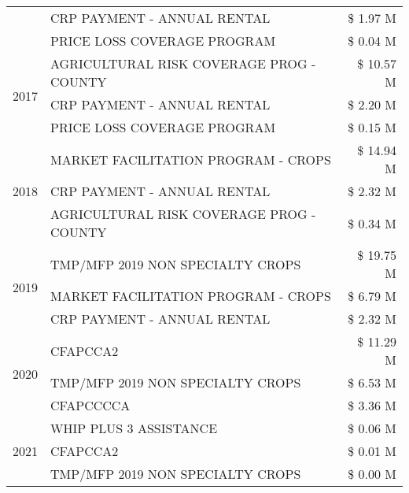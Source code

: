 \begin{tabular}{llr}
 & CRP PAYMENT - ANNUAL RENTAL                   & \$ 1.97 M \\
 & PRICE LOSS COVERAGE PROGRAM                   & \$ 0.04 M \\
\cline{1-3}
\multirow[t]{3}{*}{2017} & AGRICULTURAL RISK COVERAGE PROG - COUNTY & \$ 10.57 M \\
 & CRP PAYMENT - ANNUAL RENTAL & \$ 2.20 M \\
 & PRICE LOSS COVERAGE PROGRAM & \$ 0.15 M \\
\cline{1-3}
\multirow[t]{3}{*}{2018} & MARKET FACILITATION PROGRAM - CROPS & \$ 14.94 M \\
 & CRP PAYMENT - ANNUAL RENTAL & \$ 2.32 M \\
 & AGRICULTURAL RISK COVERAGE PROG - COUNTY & \$ 0.34 M \\
\cline{1-3}
\multirow[t]{3}{*}{2019} & TMP/MFP 2019 NON SPECIALTY CROPS & \$ 19.75 M \\
 & MARKET FACILITATION PROGRAM - CROPS & \$ 6.79 M \\
 & CRP PAYMENT - ANNUAL RENTAL & \$ 2.32 M \\
\cline{1-3}
\multirow[t]{3}{*}{2020} & CFAPCCA2 & \$ 11.29 M \\
 & TMP/MFP 2019 NON SPECIALTY CROPS & \$ 6.53 M \\
 & CFAPCCCCA & \$ 3.36 M \\
\cline{1-3}
\multirow[t]{3}{*}{2021} & WHIP PLUS 3 ASSISTANCE & \$ 0.06 M \\
 & CFAPCCA2 & \$ 0.01 M \\
 & TMP/MFP 2019 NON SPECIALTY CROPS & \$ 0.00 M \\
\cline{1-3}
\bottomrule
\end{tabular}
